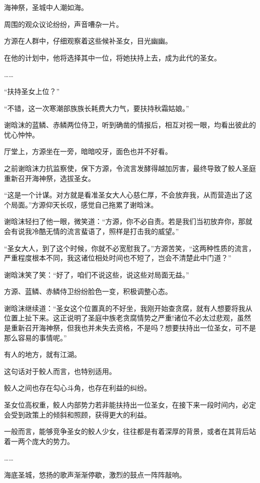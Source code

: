 
\begin{this_body}

海神祭，圣城中人潮如海。

周围的观众议论纷纷，声音嘈杂一片。

方源在人群中，仔细观察着这些候补圣女，目光幽幽。

在他的计划中，他将选择其中一位，将她扶持上去，成为此代的圣女。

……

“扶持圣女上位？”

“不错，这一次寒潮部族族长耗费大力气，要扶持秋霜姑娘。”

谢晗沫的蓝鳞、赤鳞两位侍卫，听到确凿的情报后，相互对视一眼，均看出彼此的忧心忡忡。

厅堂上，方源坐在一旁，暗暗咬牙，面色也并不好看。

之前谢晗沫力抗监察使，保下方源，令流言发酵得越加厉害，最终导致了鲛人圣庭重新召开海神祭，选拔圣女。

“这是一个计谋。对方就是看准圣女大人心慈仁厚，不会放弃我，从而营造出了这个局面。”方源仰天长叹，感觉自己拖累了谢晗沫。

谢晗沫轻扫了他一眼，微笑道：“方源，你不必自责。若是我们当初放弃你，那就会有说我冷酷无情的流言蜚语了，照样是打击我的威望。”

“圣女大人，到了这个时候，你就不必宽慰我了。”方源苦笑，“这两种性质的流言，严重程度根本不同，我这诸位相处时间也不短了，岂会不清楚此中门道？”

谢晗沫笑了笑：“好了，咱们不说这些，说这些对局面无益。”

方源、蓝鳞、赤鳞侍卫纷纷脸色一变，积极调整心态。

谢晗沫继续道：“圣女这个位置真的不好坐，我刚开始查贪腐，就有人想要将我从位置上扯下来。这正说明了圣庭中族老贪腐情势之严重!诸位不必太过悲观，虽然是重新召开海神祭，但我也并未失去资格，不是吗？想要扶持出一位圣女，可不是那么容易的事情呢。”

有人的地方，就有江湖。

这句话对于鲛人而言，也特别适用。

鲛人之间也存在勾心斗角，也存在利益的纠纷。

圣女位高权重，鲛人内部势力若非能扶持出一位圣女，在接下来一段时间内，必定会受到政策上的倾斜和照顾，获得更大的利益。

一般而言，能够竞争圣女的鲛人少女，往往都是有着深厚的背景，或者在其背后站着一两个庞大的势力。

……

海底圣城，悠扬的歌声渐渐停歇，激烈的鼓点一阵阵敲响。


\end{this_body}
